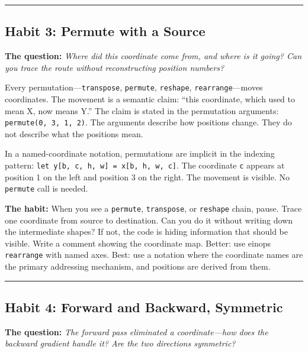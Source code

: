 \documentclass[11pt,]{article}
\begin{document}
\begin{center}\rule{0.5\linewidth}{0.4pt}\end{center}

\hypertarget{habit-3-permute-with-a-source}{%
\subsection{Habit 3: Permute with a
Source}\label{habit-3-permute-with-a-source}}

\textbf{The question:} \emph{Where did this coordinate come from, and
where is it going? Can you trace the route without reconstructing
position numbers?}

Every permutation---\texttt{transpose}, \texttt{permute},
\texttt{reshape}, \texttt{rearrange}---moves coordinates. The movement
is a semantic claim: ``this coordinate, which used to mean X, now means
Y.'' The claim is stated in the permutation arguments:
\texttt{permute(0,\ 3,\ 1,\ 2)}. The arguments describe how positions
change. They do not describe what the positions mean.

In a named-coordinate notation, permutations are implicit in the
indexing pattern:
\texttt{let\ y{[}b,\ c,\ h,\ w{]}\ =\ x{[}b,\ h,\ w,\ c{]}}. The
coordinate \texttt{c} appears at position 1 on the left and position 3
on the right. The movement is visible. No \texttt{permute} call is
needed.

\textbf{The habit:} When you see a \texttt{permute}, \texttt{transpose},
or \texttt{reshape} chain, pause. Trace one coordinate from source to
destination. Can you do it without writing down the intermediate shapes?
If not, the code is hiding information that should be visible. Write a
comment showing the coordinate map. Better: use einops
\texttt{rearrange} with named axes. Best: use a notation where the
coordinate names are the primary addressing mechanism, and positions are
derived from them.

\begin{center}\rule{0.5\linewidth}{0.4pt}\end{center}

\hypertarget{habit-4-forward-and-backward-symmetric}{%
\subsection{Habit 4: Forward and Backward,
Symmetric}\label{habit-4-forward-and-backward-symmetric}}

\textbf{The question:} \emph{The forward pass eliminated a
coordinate---how does the backward gradient handle it? Are the two
directions symmetric?}
\end{document}
